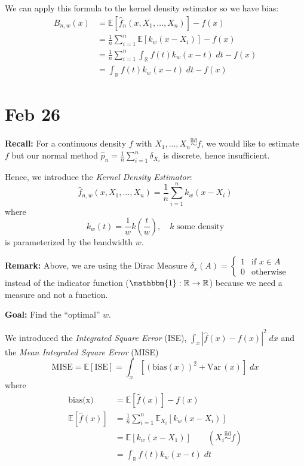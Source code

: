 \documentclass[12pt]{report}
\renewcommand{\hat}[1]{\widehat{#1}}
\newcommand{\R}{\mathbb{R}}
\newcommand{\E}{\mathbb{E}}
\newcommand{\ind}{\mathbbm{1}}
\newcommand{\abs}[1]{\left\vert #1 \right\vert}
\newcommand{\Var}{\text{Var}\,}
\newcommand{\iid}{\overset{\text{iid}}{\sim}}
\newcommand*{\tbf}[1]{\ifmmode\mathbf{#1}\else\textbf{#1}\fi}
\begin{document}
We can apply this formula to the kernel density estimator so we have bias:
\begin{align*}
    B_{n, w}(x) & = \E[\hat f_n(x, X_1, \dots, X_n)] - f(x)                         \\
                & = \frac{1}{n} \sum_{i=1}^n \E[k_w(x - X_i)] - f(x)                \\
                & = \frac{1}{n} \sum_{i=1}^n \int_{\R} f(t) k_w(x - t) \; dt - f(x) \\
                & = \int_{\R} f(t) k_w(x - t) \; dt - f(x)
\end{align*}

\section{Feb 26}

\tbf{Recall:} For a continuous density $f$ with $X_1, \dots, X_n \iid f$, we would like to estimate $f$ but our normal method $\hat p_n = \frac{1}{n} \sum_{i=1}^n \delta_{X_i}$ is discrete, hence insufficient.

Hence, we introduce the \emph{Kernel Density Estimator}:
\[\hat f_{n, w}(x, X_1, \dots, X_n) = \frac{1}{n} \sum_{i=1}^n k_w(x - X_i)\]
where
\[k_w(t) = \frac{1}{w} k(\frac{t}{w}), \quad k \text{ some density}\]
is parameterized by the bandwidth $w$.

\tbf{Remark:} Above, we are using the Dirac Measure $\delta_x(A) = \begin{cases}
        1 & \text{if } x \in A \\
        0 & \text{otherwise}
    \end{cases}$ instead of the indicator function ($\ind: \R \to \R$) because we need a measure and not a function.

\tbf{Goal:} Find the ``optimal'' $w$.

We introduced the \emph{Integrated Square Error} (ISE), $\int_x \abs{\hat f(x) - f(x)}^2\; dx$ and the \emph{Mean Integrated Square Error} (MISE)
\[\text{MISE} = \E[\text{ISE}]= \int_x [(\text{bias}(x))^2 + \Var(x)]\; dx\]
where
\begin{align*}
    \text{bias(x)} & = \E[\hat f(x)] - f(x)                            \\
    \E[\hat f(x)]  & = \frac{1}{n} \sum_{i=1}^n \E_{X_i}[k_w(x - X_i)] \\
                   & = \E[k_w(x - X_1)] \qquad (X_i \iid f)            \\
                   & = \int_{\R} f(t) k_w(x - t)\; dt
\end{align*}
\end{document}
